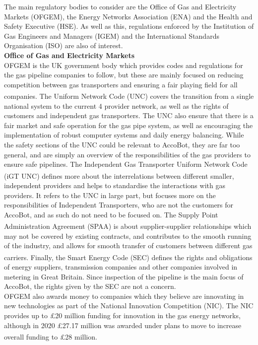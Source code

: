 \documentclass[11pt]{article}		%
\newcommand{\supercite}[1]{\textsuperscript{\cite{#1}}}		%
\begin{document}
			The main regulatory bodies to consider are the Office of Gas and Electricity Markets (OFGEM), the Energy Networks Association (ENA) and the Health and Safety Executive (HSE).
			As well as this, regulations enforced by the Institution of Gas Engineers and Managers (IGEM) and the International Standards Organisation (ISO) are also of interest.
 			\\
 			\textbf{Office of Gas and Electricity Markets}
 			\\
			OFGEM is the UK government body which provides codes and regulations for the gas pipeline companies to follow, but these are mainly focused on reducing competition between gas transporters and ensuring a fair playing field for all companies.
			The Uniform Network Code (UNC)\supercite{joint2005uniform} covers the transition from a single national system to the current 4 provider network, as well as the rights of customers and independent gas transporters.
			The UNC also ensure that there is a fair market and safe operation for the gas pipe system, as well as encouraging the implementation of robust computer systems and daily energy balancing.
			While the safety sections of the UNC could be relevant to AccoBot, they are far too general, and are simply an overview of the responsibilities of the gas providers to ensure safe pipelines.
			The Independent Gas Transporter Uniform Network Code (iGT UNC)\supercite{igt2021independent} defines more about the interrelations between different smaller, independent providers and helps to standardise the interactions with gas providers.
			It refers to the UNC in large part, but focuses more on the responsibilities of Independent Transporters, who are not the customers for AccoBot, and as such do not need to be focused on.
			The Supply Point Administration Agreement (SPAA)\supercite{spaa2021supply} is about supplier-supplier relationships which may not be covered by existing contracts, and contributes to the smooth running of the industry, and allows for smooth transfer of customers between different gas carriers.
			Finally, the Smart Energy Code (SEC)\supercite{smart2021smart} defines the rights and obligations of energy suppliers, transmission companies and other companies involved in metering in Great Britain.
			Since inspection of the pipeline is the main focus of AccoBot, the rights given by the SEC are not a concern.
			\\
			OFGEM also awards money to companies which they believe are innovating in new technologies as part of the National Innovation Competition (NIC).
			The NIC provides up to £20 million funding for innovation in the gas energy networks, although in 2020 £27.17 million was awarded under plans to move to increase overall funding to £28 million\supercite{ofgem2020nic}.
\end{document}
